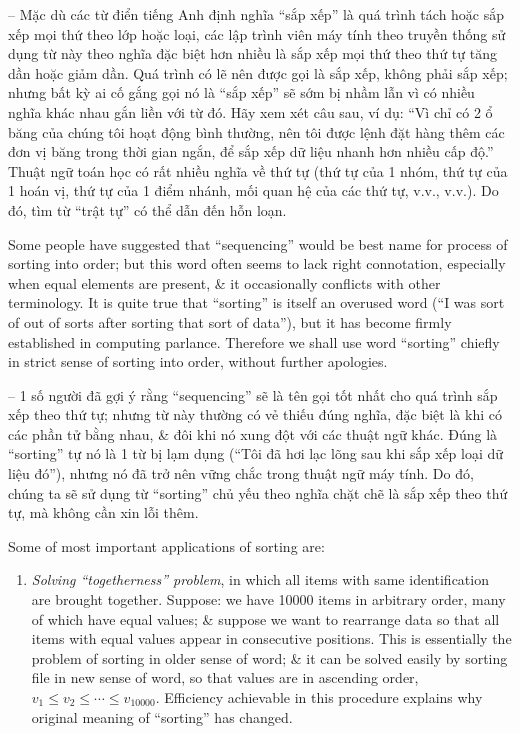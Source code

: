\documentclass{article}
\begin{document}
\begin{itemize}
    -- Mặc dù các từ điển tiếng Anh định nghĩa ``sắp xếp'' là quá trình tách hoặc sắp xếp mọi thứ theo lớp hoặc loại, các lập trình viên máy tính theo truyền thống sử dụng từ này theo nghĩa đặc biệt hơn nhiều là sắp xếp mọi thứ theo thứ tự tăng dần hoặc giảm dần. Quá trình có lẽ nên được gọi là sắp xếp, không phải sắp xếp; nhưng bất kỳ ai cố gắng gọi nó là ``sắp xếp'' sẽ sớm bị nhầm lẫn vì có nhiều nghĩa khác nhau gắn liền với từ đó. Hãy xem xét câu sau, ví dụ: ``Vì chỉ có 2 ổ băng của chúng tôi hoạt động bình thường, nên tôi được lệnh đặt hàng thêm các đơn vị băng trong thời gian ngắn, để sắp xếp dữ liệu nhanh hơn nhiều cấp độ.'' Thuật ngữ toán học có rất nhiều nghĩa về thứ tự (thứ tự của 1 nhóm, thứ tự của 1 hoán vị, thứ tự của 1 điểm nhánh, mối quan hệ của các thứ tự, v.v., v.v.). Do đó, tìm từ ``trật tự'' có thể dẫn đến hỗn loạn.
    
    Some people have suggested that ``sequencing'' would be best name for process of sorting into order; but this word often seems to lack right connotation, especially when equal elements are present, \& it occasionally conflicts with other terminology. It is quite true that ``sorting'' is itself an overused word (``I was sort of out of sorts after sorting that sort of data''), but it has become firmly established in computing parlance. Therefore we shall use word ``sorting'' chiefly in strict sense of sorting into order, without further apologies.
    
    -- 1 số người đã gợi ý rằng ``sequencing'' sẽ là tên gọi tốt nhất cho quá trình sắp xếp theo thứ tự; nhưng từ này thường có vẻ thiếu đúng nghĩa, đặc biệt là khi có các phần tử bằng nhau, \& đôi khi nó xung đột với các thuật ngữ khác. Đúng là ``sorting'' tự nó là 1 từ bị lạm dụng (``Tôi đã hơi lạc lõng sau khi sắp xếp loại dữ liệu đó''), nhưng nó đã trở nên vững chắc trong thuật ngữ máy tính. Do đó, chúng ta sẽ sử dụng từ ``sorting'' chủ yếu theo nghĩa chặt chẽ là sắp xếp theo thứ tự, mà không cần xin lỗi thêm.
    
    Some of most important applications of sorting are:
    \begin{enumerate}
        \item {\it Solving ``togetherness'' problem}, in which all items with same identification are brought together. Suppose: we have 10000 items in arbitrary order, many of which have equal values; \& suppose we want to rearrange data so that all items with equal values appear in consecutive positions. This is essentially the problem of sorting in older sense of word; \& it can be solved easily by sorting file in new sense of word, so that values are in ascending order, $v_1\le v_2\le\cdots\le v_{10000}$. Efficiency achievable in this procedure explains why original meaning of ``sorting'' has changed.
        

\end{enumerate}
\end{itemize}
\end{document}
